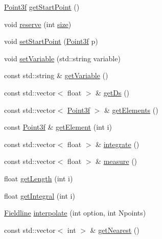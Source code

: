 \begin{DoxyCompactItemize}
\item 
\hyperlink{classccmc_1_1_point3f}{Point3f} \hyperlink{classccmc_1_1_fieldline_aa693457613225094763e0bc33fe5d730}{get\-Start\-Point} ()
\item 
void \hyperlink{classccmc_1_1_fieldline_a7a4edd677b1e1542166ac0aad783087e}{reserve} (int \hyperlink{classccmc_1_1_fieldline_abc4b63ac9b72acd2e6f26b51f659500c}{size})
\item 
void \hyperlink{classccmc_1_1_fieldline_a1bbfa14097ea4e6cb854b68a603eb891}{set\-Start\-Point} (\hyperlink{classccmc_1_1_point3f}{Point3f} p)
\item 
void \hyperlink{classccmc_1_1_fieldline_a9fa22375c1276932380a259952f966ca}{set\-Variable} (std\-::string variable)
\item 
const std\-::string \& \hyperlink{classccmc_1_1_fieldline_a9403dca3b1c98f35f9e9bb5cc340bd3a}{get\-Variable} ()
\item 
const std\-::vector$<$ float $>$ \& \hyperlink{classccmc_1_1_fieldline_af89e2d72b06b4e7157d3f7e5ac1b4928}{get\-Ds} ()
\item 
const std\-::vector$<$ \hyperlink{classccmc_1_1_point3f}{Point3f} $>$ \& \hyperlink{classccmc_1_1_fieldline_ad238f0bd5cda88ec64bbd7fa951cee87}{get\-Elements} ()
\item 
const \hyperlink{classccmc_1_1_point3f}{Point3f} \& \hyperlink{classccmc_1_1_fieldline_a0ef624f19c2f6268c1539fe8a5246ffb}{get\-Element} (int i)
\item 
const std\-::vector$<$ float $>$ \& \hyperlink{classccmc_1_1_fieldline_ae0923bc16ca3181c3d3a7c46c5cad55a}{integrate} ()
\item 
const std\-::vector$<$ float $>$ \& \hyperlink{classccmc_1_1_fieldline_a39cd6708e840c29c4e85b445fb14e017}{measure} ()
\item 
float \hyperlink{classccmc_1_1_fieldline_a15e1c45287ad52604fc681c40b02c3c2}{get\-Length} (int i)
\item 
float \hyperlink{classccmc_1_1_fieldline_afd11cbe0d7332baaa2f659e909e9206b}{get\-Integral} (int i)
\item 
\hyperlink{classccmc_1_1_fieldline}{Fieldline} \hyperlink{classccmc_1_1_fieldline_a3c641db4971a6cbcce5ef3fb0bc3e01d}{interpolate} (int option, int Npoints)
\item 
const std\-::vector$<$ int $>$ \& \hyperlink{classccmc_1_1_fieldline_a69dbf2cdbb0bd332e07d605545094441}{get\-Nearest} ()
\end{DoxyCompactItemize}


